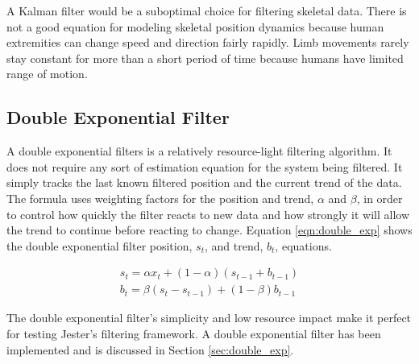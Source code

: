 A Kalman filter would be a suboptimal choice for filtering skeletal data. There is not a good equation for modeling skeletal position dynamics because human extremities can change speed and direction fairly rapidly. Limb movements rarely stay constant for more than a short period of time because humans have limited range of motion. 

\subsection{Double Exponential Filter}

A double exponential filters is a relatively resource-light filtering algorithm. It does not require any sort of estimation equation for the system being filtered. It simply tracks the last known filtered position and the current trend of the data. The formula uses weighting factors for the position and trend, $\alpha$ and $\beta$, in order to control how quickly the filter reacts to new data and how strongly it will allow the trend to continue before reacting to change. Equation \ref{eqn:double_exp} shows the double exponential filter position, $s_{t}$, and trend, $b_{t}$, equations.

\begin{equation}\label{eqn:double_exp}
\begin{split}
s_{t} = \alpha x_{t} + (1 - \alpha)(s_{t-1} + b_{t - 1})\\
b_{t} = \beta (s_{t} - s_{t - 1}) + (1 - \beta)b_{t - 1}
\end{split}
\end{equation}

The double exponential filter's simplicity and low resource impact make it perfect for testing Jester's filtering framework. A double exponential filter has been implemented and is discussed in Section \ref{sec:double_exp}.

